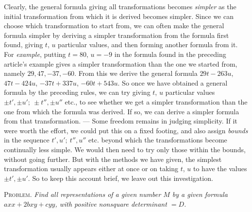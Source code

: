 Clearly, the general formula giving all transformations becomes \textit{simpler} as the initial transformation from which it is derived becomes simpler. Since we can choose which transformation to start from, we can often make the general formula simpler by deriving a simpler transformation from the formula first found, giving $t$, $u$ particular values, and then forming another formula from it. For \textit{example}, putting $t=80$, $u=-9$ in the formula found in the preceding article's example gives a simpler transformation than the one we started from, namely $29,47,-37,-60$. From this we derive the general formula $29t-263u$, $47t-424u$, $-37t+337u$, $-60t+543u$. So once we have obtained a general formula by the preceding rules, we can try giving $t$, $u$ particular values $\pm t',\pm u';\ \pm t'',\pm u''$ etc., to see whether we get a simpler transformation than the one from which the formula was derived. If so, we can derive a simpler formula from that transformation. --- Some freedom remains in judging simplicity. If it were worth the effort, we could put this on a fixed footing, and also assign \textit{bounds} in the sequence $t',u';\ t'',u''$ etc. beyond which the transformations become continually less simple. We would then need to try only those within the bounds, without going further. But with the methods we have given, the simplest transformation usually appears either at
once or on taking $t$, $u$ to have the values $\pm t',\pm u'$. So to keep this account brief, we leave out this investigation.

\textsc{Problem.} \textit{Find all representations of a given number $M$ by a given formula $axx+2bxy+cyy$, with positive nonsquare determinant $=D$.}

